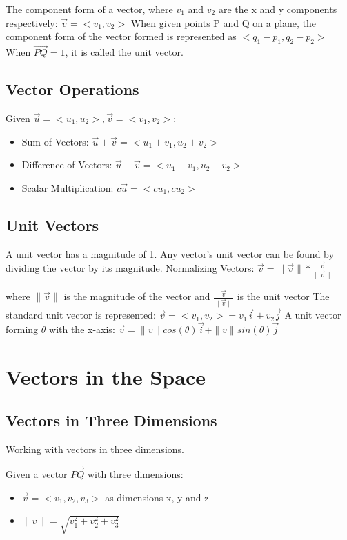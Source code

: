 \documentclass [12 pt, oneside] {book}
\begin{document}
The component form of a vector, where $v_1$ and $v_2$ are the x and y components respectively: $\vec{v}=<v_1,v_2>$
When given points P and Q on a plane, the component form of the vector formed is represented as $<q_1-p_1,q_2-p_2>$
When $\vec{PQ} = 1$, it is called the unit vector.

\subsection{Vector Operations}
Given $\vec{u} = <u_1,u_2>, \vec{v} = <v_1,v_2>$:
\begin{itemize}
\item Sum of Vectors: $\vec{u} + \vec{v} = <u_1 + v_1, u_2 + v_2>$
\item Difference of Vectors: $\vec{u} - \vec{v} = <u_1 - v_1, u_2 - v_2>$
\item Scalar Multiplication: $c\vec{u} = <cu_1, cu_2>$
\end{itemize}

\subsection{Unit Vectors}
A unit vector has a magnitude of 1. Any vector's unit vector can be found by dividing the vector by its magnitude.\newline
Normalizing Vectors: $\vec{v} = \| \vec{v} \| * \frac{\vec{v}}{\| \vec{v} \|}$

where $\| \vec{v} \|$ is the magnitude of the vector and $\frac{\vec{v}}{\| \vec{v} \|}$ is the unit vector\newline
The standard unit vector is represented: $\vec{v} = <v_1,v_2> = v_1\vec{i} + v_2\vec{j}$\newline
A unit vector forming $\theta$ with the x-axis: $\vec{v} = \| v \|cos(\theta)\vec{i} + \| v \|sin(\theta)\vec{j}$

\section{Vectors in the Space}
\subsection{Vectors in Three Dimensions}
Working with vectors in three dimensions.

Given a vector $\vec{PQ}$ with three dimensions:
\begin{itemize}
\item $\vec{v}=<v_1,v_2,v_3>$ as dimensions x, y and z
\item $\| v \|=\sqrt{v_1^2+v_2^2+v_3^2}$
\end{itemize}
\end{document}
